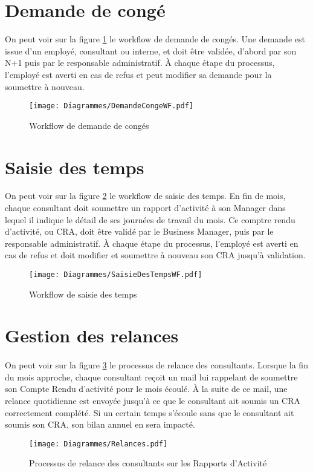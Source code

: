 \section{Demande de congé}
On peut voir sur la figure \ref{conges} le workflow de demande de congés. Une demande est issue d'un employé, consultant ou interne, et doit être validée, d'abord par son N+1 puis par le responsable administratif. À chaque étape du processus, l'employé est averti en cas de refus et peut modifier sa demande pour la soumettre à nouveau.
\begin{figure}
	\texttt{[image: Diagrammes/DemandeCongeWF.pdf]}
	\caption{Workflow de demande de congés}
	\label{conges}
\end{figure}

\section{Saisie des temps}

On peut voir sur la figure \ref{tps} le workflow de saisie des temps. En fin de mois, chaque consultant doit soumettre un rapport d'activité à son Manager dans lequel il indique le détail de ses journées de travail du mois. Ce comptre rendu d'activité, ou CRA, doit être validé par le Business Manager, puis par le responsable administratif. À chaque étape du processus, l'employé est averti en cas de refus et doit modifier et soumettre à nouveau son CRA jusqu'à validation.
\begin{figure}
	\texttt{[image: Diagrammes/SaisieDesTempsWF.pdf]}
	\caption{Workflow de saisie des temps}
	\label{tps}
\end{figure}


\section{Gestion des relances}
\paragraph{} On peut voir sur la figure \ref{relances} le processus de relance des consultants. Lorsque la fin du mois approche, chaque consultant reçoit un mail lui rappelant de soumettre son Compte Rendu d'activité pour le mois écoulé. À la suite de ce mail, une relance quotidienne est envoyée jusqu'à ce que le consultant ait soumis un CRA correctement complété. Si un certain temps s'écoule sans que le consultant ait soumis son CRA, son bilan annuel en sera impacté.
\begin{figure}
	\texttt{[image: Diagrammes/Relances.pdf]}
	\caption{Processus de relance des consultants sur les Rapports d'Activité}
	\label{relances}
\end{figure}



